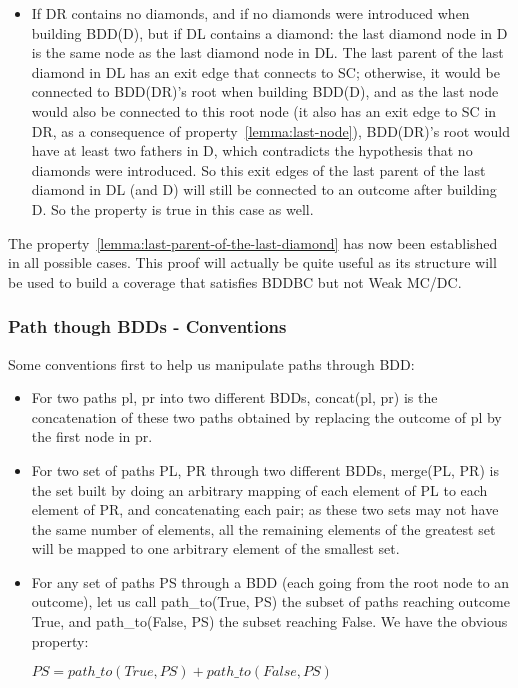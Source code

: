 \documentclass[a4paper,12pt,twoside]{article}
\begin{document}
\begin{itemize}
\begin{itemize}
  \item If DR contains no diamonds, and if no diamonds were introduced
    when building BDD(D), but if DL contains a diamond: the last
    diamond node in D is the same node as the last diamond node in DL.
    The last parent of the last diamond in DL has an exit edge that
    connects to SC; otherwise, it would be connected to BDD(DR)'s root
    when building BDD(D), and as the last node would also be connected
    to this root node (it also has an exit edge to SC in DR, as a
    consequence of property~\ref{lemma:last-node}), BDD(DR)'s root
    would have at least two fathers in D, which contradicts the
    hypothesis that no diamonds were introduced. So this exit edges of
    the last parent of the last diamond in DL (and D) will still be
    connected to an outcome after building D. So the property is true
    in this case as well.
  \end{itemize}
\end{itemize}

The property~\ref{lemma:last-parent-of-the-last-diamond} has now been
established in all possible cases. This proof will actually be quite
useful as its structure will be used to build a coverage that satisfies
BDDBC but not Weak MC/DC.

\subsubsection{Path though BDDs - Conventions}

Some conventions first to help us manipulate paths through BDD:

\begin{itemize}
\item For two paths pl, pr into two different BDDs,
  concat(pl, pr) is the concatenation of these two paths obtained by replacing
  the outcome of pl by the first node in pr.

\item For two set of paths PL, PR through two different BDDs, merge(PL, PR)
  is the set built by doing an arbitrary mapping of each element
  of PL to each element of PR, and concatenating each pair; as these
  two sets may not have the same number of elements, all the remaining
  elements of the greatest set will be mapped to one arbitrary element
  of the smallest set.

\item For any set of paths PS through a BDD (each going from the root node to
  an outcome), let us call path\_to(True, PS) the subset of paths reaching
  outcome True, and path\_to(False, PS) the subset reaching False. We have
  the obvious property:

  $PS = path\_to(True, PS) + path\_to(False, PS)$
\end{itemize}
\end{document}

